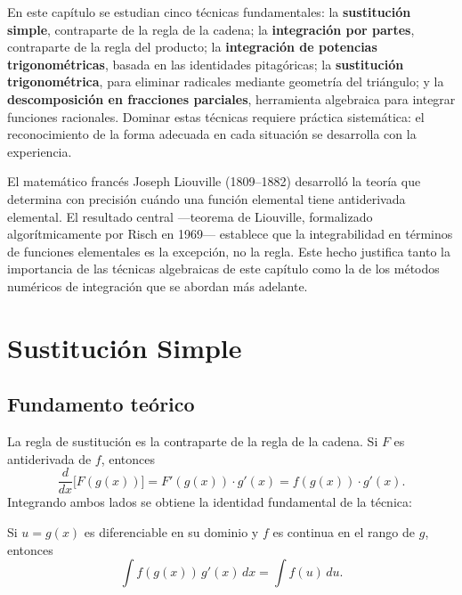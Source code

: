 En este capítulo se estudian cinco técnicas fundamentales: la
\textbf{sustitución simple}, contraparte de la regla de la cadena; la
\textbf{integración por partes}, contraparte de la regla del producto; la
\textbf{integración de potencias trigonométricas}, basada en las identidades
pitagóricas; la \textbf{sustitución trigonométrica}, para eliminar radicales
mediante geometría del triángulo; y la \textbf{descomposición en fracciones
parciales}, herramienta algebraica para integrar funciones racionales.
Dominar estas técnicas requiere práctica sistemática: el reconocimiento de la
forma adecuada en cada situación se desarrolla con la experiencia.

\begin{rem}
El matemático francés Joseph Liouville (1809--1882) desarrolló la teoría que
determina con precisión cuándo una función elemental tiene antiderivada
elemental. El resultado central —teorema de Liouville, formalizado
algorítmicamente por Risch en 1969— establece que la integrabilidad en
términos de funciones elementales es la excepción, no la regla. Este hecho
justifica tanto la importancia de las técnicas algebraicas de este capítulo
como la de los métodos numéricos de integración que se abordan más adelante.
\end{rem}

\section{Sustitución Simple}

\subsection{Fundamento teórico}

La regla de sustitución es la contraparte de la regla de la cadena. Si $F$
es antiderivada de $f$, entonces
\[
\frac{d}{dx}\big[F(g(x))\big] = F'(g(x))\cdot g'(x) = f(g(x))\cdot g'(x).
\]
Integrando ambos lados se obtiene la identidad fundamental de la técnica:

\begin{theorem}
Si $u = g(x)$ es diferenciable en su dominio y $f$ es continua en el rango
de $g$, entonces
\[
\int f(g(x))\, g'(x)\, dx = \int f(u)\, du.
\]
\end{theorem}

